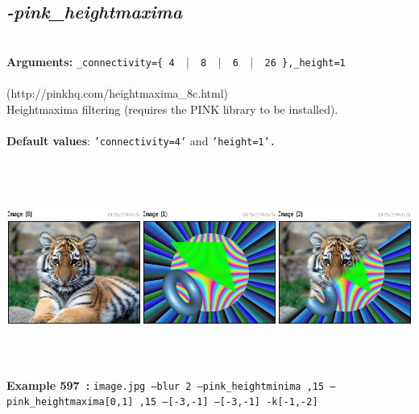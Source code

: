 \documentclass[a4paper,11pt,twoside]{book}
\begin{document}
\subsection{\emph{-pink\_heightmaxima} }\vspace*{-0.5em}
~\\\textbf{Arguments: } 
{\small \texttt{\_connectivity=\{ 4 ~$|$~ 8 ~$|$~ 6 ~$|$~ 26 \},\_height=1}}\\~\\
(http://pinkhq.com/heightmaxima\_8c.html)
~\\Heightmaxima filtering (requires the PINK library to be installed).
~\\~\\\textbf{Default values}: {\small \texttt{'connectivity=4'} and \texttt{'height=1'.}}
\begin{center}\includegraphics[keepaspectratio=true,height=7cm,width=\textwidth]{img/gmic_def597.jpg}\\
{\footnotesize \textbf{Example 597~:} \texttt{image.jpg --blur 2 --pink\_heightminima ,15 --pink\_heightmaxima[0,1] ,15 --[-3,-1] --[-3,-1] -k[-1,-2]}}
\end{center}
\end{document}
